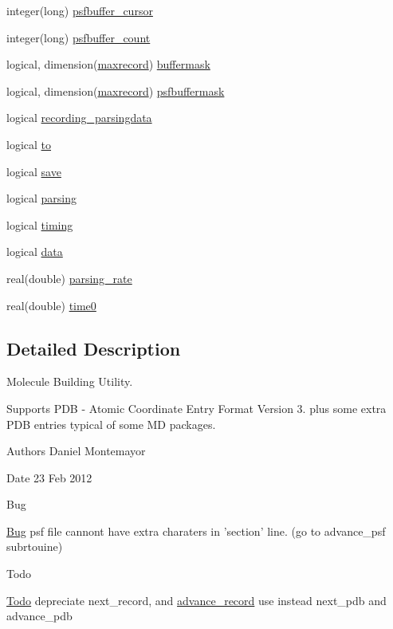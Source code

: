\begin{DoxyCompactItemize}
\item 
integer(long) \hyperlink{classmolreader_ab080c636a2423beb139bdd65dcd884c3}{psfbuffer\+\_\+cursor}
\item 
integer(long) \hyperlink{classmolreader_af2dddaa7f6249a39287ffcdcbe2ce558}{psfbuffer\+\_\+count}
\item 
logical, dimension(\hyperlink{classmolreader_a7192fdfba4bcb0ee7504a9c6695c7106}{maxrecord}) \hyperlink{classmolreader_a3368bfc7f2d07a7f472a8118220516a9}{buffermask}
\item 
logical, dimension(\hyperlink{classmolreader_a7192fdfba4bcb0ee7504a9c6695c7106}{maxrecord}) \hyperlink{classmolreader_a747bd2c32990916c313506c805317e88}{psfbuffermask}
\item 
logical \hyperlink{classmolreader_a1f82d6f3302ab89b43d1fcbcba5d8fb2}{recording\+\_\+parsingdata}
\item 
logical \hyperlink{classmolreader_aec460f295b88cb8eb8dd58901edce0ba}{to}
\item 
logical \hyperlink{classmolreader_af3ae5caa4d00fa50c74d2f3154e8ea7c}{save}
\item 
logical \hyperlink{classmolreader_a151a8b8c33b86ab86d352aeaaf9ec84b}{parsing}
\item 
logical \hyperlink{classmolreader_a29899cd9778ac12af6bad404c1092518}{timing}
\item 
logical \hyperlink{classmolreader_ad29941441961d6bb225120cc88f93db7}{data}
\item 
real(double) \hyperlink{classmolreader_a5cf7dc5ccdeb068704a693ec6b248796}{parsing\+\_\+rate}
\item 
real(double) \hyperlink{classmolreader_ad5b1ed6898caa1c2161f0cdc6c10fc72}{time0}
\end{DoxyCompactItemize}


\subsection{Detailed Description}
Molecule Building Utility. 

Supports P\+D\+B -\/ Atomic Coordinate Entry Format Version 3. plus some extra P\+D\+B entries typical of some M\+D packages. \begin{DoxyAuthor}{Authors}
Daniel Montemayor 
\end{DoxyAuthor}
\begin{DoxyDate}{Date}
23 Feb 2012 
\end{DoxyDate}
\begin{DoxyRefDesc}{Bug}
\item[\hyperlink{bug__bug000001}{Bug}]psf file cannont have extra charaters in 'section' line. (go to advance\+\_\+psf subrtouine) \end{DoxyRefDesc}
\begin{DoxyRefDesc}{Todo}
\item[\hyperlink{todo__todo000005}{Todo}]depreciate next\+\_\+record, and \hyperlink{interfacemolreader_1_1advance__record}{advance\+\_\+record} use instead next\+\_\+pdb and advance\+\_\+pdb \end{DoxyRefDesc}


